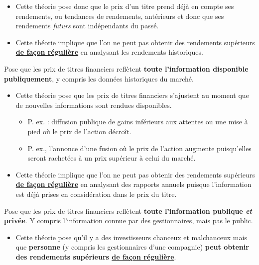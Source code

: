 \documentclass[10pt, french]{article}
\begin{document}
\begin{multicols*}{2}
\begin{definitionNOHFILLsub}
\begin{itemize}
	\item	Cette théorie pose donc que le prix d'un titre prend déjà en compte ses rendements, ou tendances de rendements, antérieurs et donc que ses rendements \textit{futurs} sont indépendants du passé.
	\item	Cette théorie implique que l'on ne peut pas obtenir des rendements supérieurs \underline{\textbf{de façon régulière}} en analysant les rendements historiques.
\end{itemize}
\end{definitionNOHFILLsub}


\begin{definitionNOHFILLsub}
Pose que les prix de titres financiers reflètent \textbf{toute l'information disponible publiquement}, y compris les données historiques du marché.

\begin{itemize}
	\item	Cette théorie pose que les prix de titres financiers s'ajustent au moment que de nouvelles informations sont rendues disponibles.
		\begin{itemize}
		\item	P. ex. : diffusion publique de gains inférieurs aux attentes ou une mise à pied où le prix de l'action décroît.
		\item	P. ex., l'annonce d'une fusion où le prix de l'action augmente puisqu'elles seront rachetées à un prix supérieur à celui du marché.
		\end{itemize}
	\item	Cette théorie implique que l'on ne peut pas obtenir des rendements supérieurs \underline{\textbf{de façon régulière}} en analysant des rapports annuels puisque l'information est déjà prises en considération dans le prix du titre.
\end{itemize}
\end{definitionNOHFILLsub}


\begin{definitionNOHFILLsub}
Pose que les prix de titres financiers reflètent \textbf{toute l'information publique \textit{et} privée}. Y compris l'information connue par des gestionnaires, mais pas le public.

\begin{itemize}
	\item	Cette théorie pose qu'il y a des investisseurs chanceux et malchanceux mais que \textbf{personne} (y compris les gestionnaires d'une compagnie) \textbf{peut obtenir des rendements supérieurs \underline{de façon régulière}}.
\end{itemize}
\end{definitionNOHFILLsub}


\end{multicols*}
\end{document}
